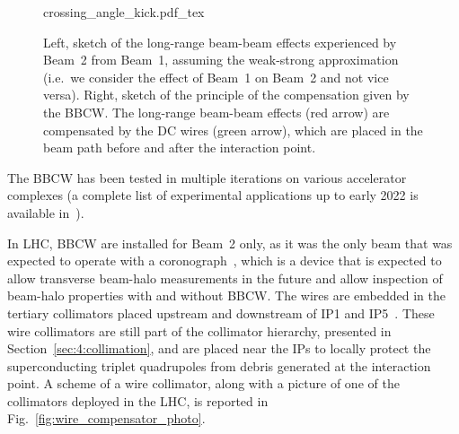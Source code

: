 \begin{figure}[th]
    \centering
    \def\svgwidth{1.0\textwidth}
    {crossing_angle_kick.pdf_tex}
    \caption{Left, sketch of the long-range beam-beam effects experienced by Beam~2 from Beam~1, assuming the weak-strong approximation (i.e.\ we consider the effect of Beam~1 on Beam~2 and not vice versa). Right, sketch of the principle of the compensation given by the BBCW. The long-range beam-beam effects (red arrow) are compensated by the DC wires (green arrow), which are placed in the beam path before and after the interaction point.}
    \label{fig:wire-baseline}
\end{figure}

The BBCW has been tested in multiple iterations on various accelerator complexes (a complete list of experimental applications up to early 2022 is available in~\cite{axel.wires}).

In LHC, BBCW are installed for Beam~2 only, as it was the only beam that was expected to operate with a coronograph~\cite{Goldblatt:2313940}, which is a device that is expected to allow transverse beam-halo measurements in the future and allow inspection of beam-halo properties with and without BBCW. The wires are embedded in the tertiary collimators placed upstream and downstream of IP1 and IP5~\cite{Rossi:2696270}. These wire collimators are still part of the collimator hierarchy, presented in Section~\ref{sec:4:collimation}, and are placed near the IPs to locally protect the superconducting triplet quadrupoles from debris generated at the interaction point. A scheme of a wire collimator, along with a picture of one of the collimators deployed in the LHC, is reported in Fig.~\ref{fig:wire_compensator_photo}.

